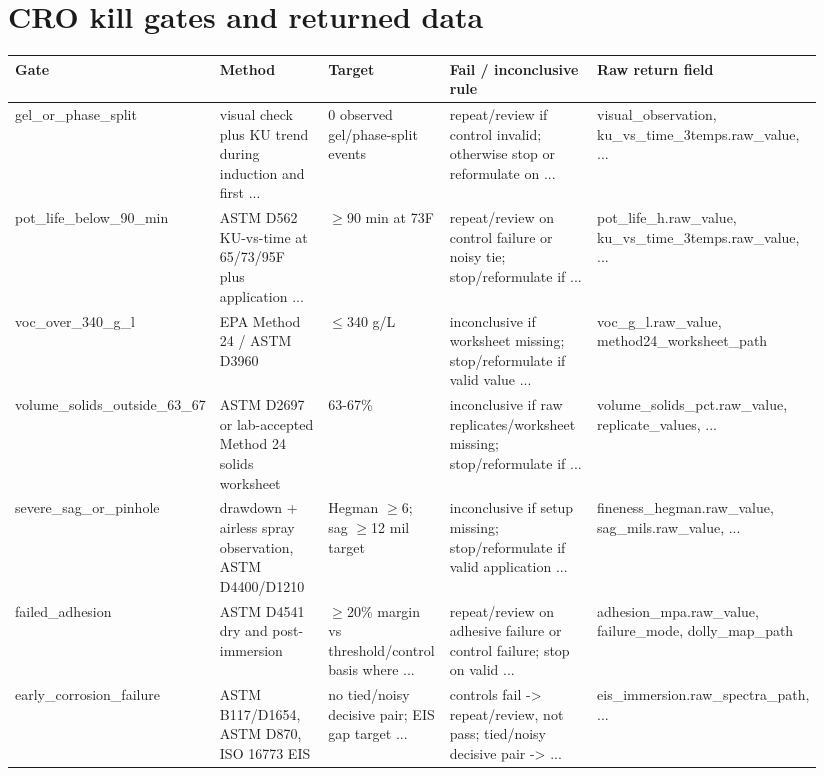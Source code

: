 \documentclass[10pt]{article}
\begin{document}
\section{CRO kill gates and returned data}
{\tiny\begin{longtable}{@{}p{0.16\linewidth} p{0.22\linewidth} p{0.16\linewidth} p{0.25\linewidth} p{0.15\linewidth}@{}}\toprule \textbf{Gate} & \textbf{Method} & \textbf{Target} & \textbf{Fail / inconclusive rule} & \textbf{Raw return field} \\ \midrule gel\_or\_phase\_split & visual check plus KU trend during induction and first ... & 0 observed gel/phase-split events & repeat/review if control invalid; otherwise stop or reformulate on ... & visual\_observation, ku\_vs\_time\_3temps.raw\_value, ... \\ pot\_life\_below\_90\_min & ASTM D562 KU-vs-time at 65/73/95F plus application ... & $\geq$90 min at 73F & repeat/review on control failure or noisy tie; stop/reformulate if ... & pot\_life\_h.raw\_value, ku\_vs\_time\_3temps.raw\_value, ... \\ voc\_over\_340\_g\_l & EPA Method 24 / ASTM D3960 & $\leq$340 g/L & inconclusive if worksheet missing; stop/reformulate if valid value ... & voc\_g\_l.raw\_value, method24\_worksheet\_path \\ volume\_solids\_outside\_63\_67 & ASTM D2697 or lab-accepted Method 24 solids worksheet & 63-67\% & inconclusive if raw replicates/worksheet missing; stop/reformulate if ... & volume\_solids\_pct.raw\_value, replicate\_values, ... \\ severe\_sag\_or\_pinhole & drawdown + airless spray observation, ASTM D4400/D1210 & Hegman $\geq$6; sag $\geq$12 mil target & inconclusive if setup missing; stop/reformulate if valid application ... & fineness\_hegman.raw\_value, sag\_mils.raw\_value, ... \\ failed\_adhesion & ASTM D4541 dry and post-immersion & $\geq$20\% margin vs threshold/control basis where ... & repeat/review on adhesive failure or control failure; stop on valid ... & adhesion\_mpa.raw\_value, failure\_mode, dolly\_map\_path \\ early\_corrosion\_failure & ASTM B117/D1654, ASTM D870, ISO 16773 EIS & no tied/noisy decisive pair; EIS gap target ... & controls fail -> repeat/review, not pass; tied/noisy decisive pair -> ... & eis\_immersion.raw\_spectra\_path, ... \\ \bottomrule\end{longtable}}
\newpage
\end{document}
